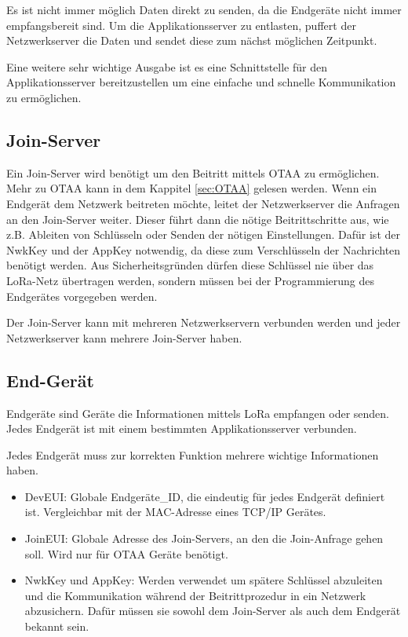 \documentclass[a4paper, 12pt]{article}
\begin{document}
            Es ist nicht immer möglich Daten direkt zu senden, da die Endgeräte nicht immer empfangsbereit sind. Um 
            die Applikationsserver zu entlasten, puffert der Netzwerkserver die Daten und sendet diese zum nächst 
            möglichen Zeitpunkt.

            Eine weitere sehr wichtige Ausgabe ist es eine Schnittstelle für den Applikationsserver bereitzustellen 
            um eine 
            einfache und schnelle Kommunikation zu ermöglichen.
        \subsection{Join-Server}
            Ein Join-Server wird benötigt um den Beitritt mittels OTAA zu ermöglichen. Mehr zu OTAA kann in dem 
            Kappitel \ref{sec:OTAA}  gelesen werden. Wenn ein Endgerät dem Netzwerk beitreten möchte, leitet 
            der Netzwerkserver die Anfragen an den Join-Server weiter. Dieser führt dann die nötige Beitrittschritte 
            aus, wie z.B. Ableiten von Schlüsseln oder Senden der nötigen Einstellungen. Dafür ist der NwkKey und 
            der AppKey notwendig, da diese zum Verschlüsseln der Nachrichten benötigt werden. 
            Aus Sicherheitsgründen dürfen diese Schlüssel nie über das LoRa-Netz übertragen werden, sondern müssen
            bei der Programmierung des Endgerätes vorgegeben werden. \cite[S. 9 f.]{LoRaBack}

            Der Join-Server kann mit mehreren Netzwerkservern verbunden werden und jeder Netzwerkserver kann mehrere 
            Join-Server haben.
        \subsection{End-Gerät}\label{sec:endgerät}
            Endgeräte sind Geräte die Informationen mittels LoRa empfangen oder senden. Jedes Endgerät ist mit einem 
            bestimmten Applikationsserver verbunden.

            Jedes Endgerät muss zur korrekten Funktion mehrere wichtige Informationen haben.
            \begin{itemize}
                \item DevEUI: Globale Endgeräte\_ID, die eindeutig für jedes Endgerät definiert ist. Vergleichbar 
                mit der MAC-Adresse eines TCP/IP Gerätes.
                \item JoinEUI: Globale Adresse des Join-Servers, an den die Join-Anfrage gehen soll. Wird nur für OTAA Geräte
                benötigt.
                \item NwkKey und AppKey: Werden verwendet um spätere Schlüssel abzuleiten und die Kommunikation während
                der Beitrittprozedur in ein Netzwerk abzusichern. Dafür müssen sie sowohl dem Join-Server als auch dem
                Endgerät bekannt sein.
            \end{itemize}
            \cite[S.47 ff.]{LoRaSpec}
\end{document}
